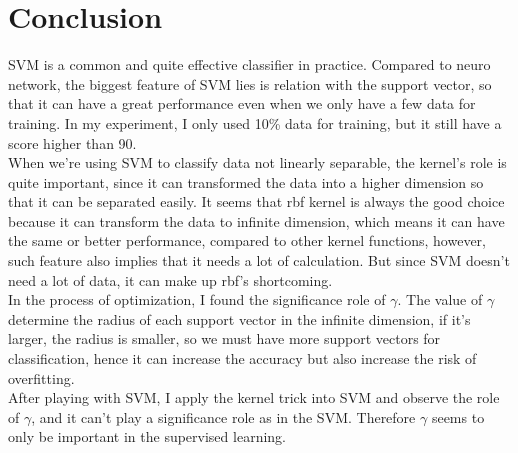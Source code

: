 \documentclass{article}
\begin{document}
\section{Conclusion}
SVM is a common and quite effective classifier in practice. Compared to neuro network, the biggest feature of SVM lies is relation with the support vector, so that it can have a great performance even when we only have a few data for training. In my experiment, I only used 10\% data for training, but it still have a score higher than 90. 
\\When we're using SVM to classify data not linearly separable, the kernel's role is quite important, since it can transformed the data into a higher dimension so that it can be separated easily. It seems that rbf kernel is always the good choice because it can transform the data to infinite dimension, which means it can have the same or better performance, compared to other kernel functions, however, such feature also implies that it needs a lot of calculation. But since SVM doesn't need a lot of data, it can make up rbf's shortcoming.
\\In the process of optimization, I found the significance role of $\gamma$. The value of $\gamma$ determine the radius of each support vector in the infinite dimension, if it's larger, the radius is smaller, so we must have more support vectors for classification, hence it can increase the accuracy but also increase the risk of overfitting.
\\After playing with SVM, I apply the kernel trick into SVM and observe the role of $\gamma$, and it can't play a significance role as in the SVM. Therefore $\gamma$ seems to only be important in the supervised learning.
\end{document}

